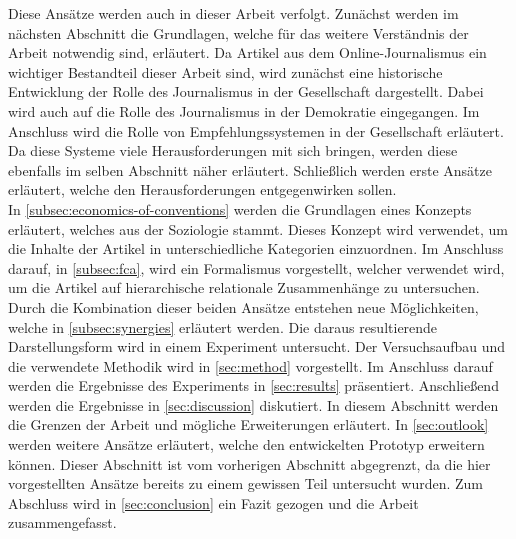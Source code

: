 Diese Ansätze werden auch in dieser Arbeit verfolgt.
Zunächst werden im nächsten Abschnitt die Grundlagen, welche für das weitere Verständnis der Arbeit notwendig sind, erläutert.
Da Artikel aus dem Online-Journalismus ein wichtiger Bestandteil dieser Arbeit sind, wird zunächst eine historische Entwicklung der Rolle des Journalismus in der Gesellschaft dargestellt.
Dabei wird auch auf die Rolle des Journalismus in der Demokratie eingegangen.
Im Anschluss wird die Rolle von Empfehlungssystemen in der Gesellschaft erläutert.
Da diese Systeme viele Herausforderungen mit sich bringen, werden diese ebenfalls im selben Abschnitt näher erläutert.
Schließlich werden erste Ansätze erläutert, welche den Herausforderungen entgegenwirken sollen. \\

In \autoref{subsec:economics-of-conventions} werden die Grundlagen eines Konzepts erläutert, welches aus der Soziologie stammt.
Dieses Konzept wird verwendet, um die Inhalte der Artikel in unterschiedliche Kategorien einzuordnen.
Im Anschluss darauf, in \autoref{subsec:fca}, wird ein Formalismus vorgestellt, welcher verwendet wird, um die Artikel auf hierarchische relationale Zusammenhänge zu untersuchen.
Durch die Kombination dieser beiden Ansätze entstehen neue Möglichkeiten, welche in \autoref{subsec:synergies} erläutert werden.
Die daraus resultierende Darstellungsform wird in einem Experiment untersucht.
Der Versuchsaufbau und die verwendete Methodik wird in \autoref{sec:method} vorgestellt.
Im Anschluss darauf werden die Ergebnisse des Experiments in \autoref{sec:results} präsentiert.
Anschließend werden die Ergebnisse in \autoref{sec:discussion} diskutiert.
In diesem Abschnitt werden die Grenzen der Arbeit und mögliche Erweiterungen erläutert.
In \autoref{sec:outlook} werden weitere Ansätze erläutert, welche den entwickelten Prototyp erweitern können.
Dieser Abschnitt ist vom vorherigen Abschnitt abgegrenzt, da die hier vorgestellten Ansätze bereits zu einem gewissen Teil untersucht wurden.
Zum Abschluss wird in \autoref{sec:conclusion} ein Fazit gezogen und die Arbeit zusammengefasst.
